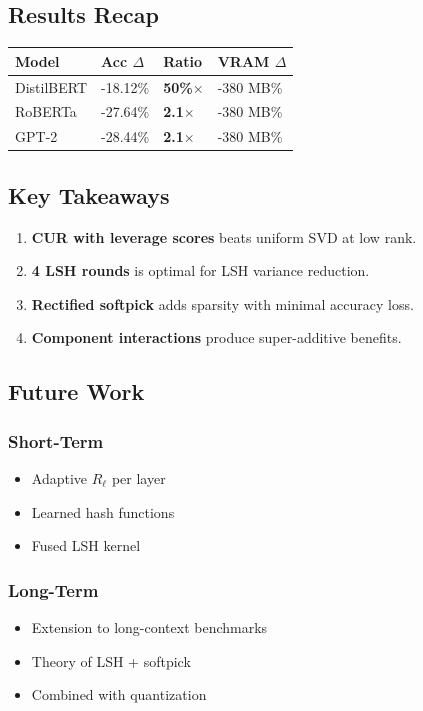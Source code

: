\subsection{Results Recap}

\begin{table}[H]
\centering
\small
\begin{tabular}{llll}
\toprule
\textbf{Model} & \textbf{Acc $\Delta$} & \textbf{Ratio} & \textbf{VRAM $\Delta$} \\
\midrule
DistilBERT & -18.12\% & \textbf{50\%$\times$} & -380 MB\% \\
RoBERTa & -27.64\% & \textbf{2.1$\times$} & -380 MB\% \\
GPT-2 & -28.44\% & \textbf{2.1$\times$} & -380 MB\% \\
\bottomrule
\end{tabular}
\end{table}

\subsection{Key Takeaways}

\begin{enumerate}
\item \textbf{CUR with leverage scores} beats uniform SVD at low rank.
\item \textbf{4 LSH rounds} is optimal for LSH variance reduction.
\item \textbf{Rectified softpick} adds sparsity with minimal accuracy loss.
\item \textbf{Component interactions} produce super-additive benefits.

\end{enumerate}
\subsection{Future Work}

\subsubsection{Short-Term}
\begin{itemize}
\item Adaptive $R_\ell$ per layer
\item Learned hash functions
\item Fused LSH kernel

\end{itemize}
\subsubsection{Long-Term}
\begin{itemize}
\item Extension to long-context benchmarks
\item Theory of LSH + softpick
\item Combined with quantization

\end{itemize}
